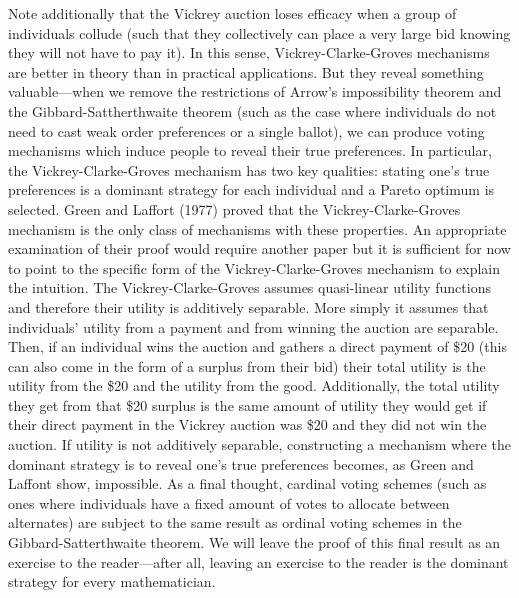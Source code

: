 \documentclass{amsart}
\theoremstyle{plain}
\begin{document}
    Note additionally that the Vickrey auction loses efficacy when a group of individuals collude (such that they collectively can place a very large bid knowing they will not have to pay it). In this sense, Vickrey-Clarke-Groves mechanisms are better in theory than in practical applications. But they reveal something valuable—when we remove the restrictions of Arrow's impossibility theorem and the Gibbard-Sattherthwaite theorem (such as the case where individuals do not need to cast weak order preferences or a single ballot), we can produce voting mechanisms which induce people to reveal their true preferences. In particular, the Vickrey-Clarke-Groves mechanism has two key qualities: stating one's true preferences is a dominant strategy for each individual and a Pareto optimum is selected. Green and Laffort (1977) proved that the Vickrey-Clarke-Groves mechanism is the only class of mechanisms with these properties. \cite{Green} An appropriate examination of their proof would require another paper but it is sufficient for now to point to the specific form of the Vickrey-Clarke-Groves mechanism to explain the intuition. The Vickrey-Clarke-Groves assumes quasi-linear utility functions and therefore their utility is additively separable. More simply it assumes that individuals' utility from a payment and from winning the auction are separable. Then, if an individual wins the auction and gathers a direct payment of \$20 (this can also come in the form of a surplus from their bid) their total utility is the utility from the \$20 and the utility from the good. Additionally, the total utility they get from that \$20 surplus is the same amount of utility they would get if their direct payment in the Vickrey auction was \$20 and they did not win the auction. If utility is not additively separable, constructing a mechanism where the dominant strategy is to reveal one's true preferences becomes, as Green and Laffont show, impossible. As a final thought, cardinal voting schemes (such as ones where individuals have a fixed amount of votes to allocate between alternates) are subject to the same result as ordinal voting schemes in the Gibbard-Satterthwaite theorem. We will leave the proof of this final result as an exercise to the reader—after all, leaving an exercise to the reader is the dominant strategy for every mathematician.




\newpage
\printbibliography
\end{document}
